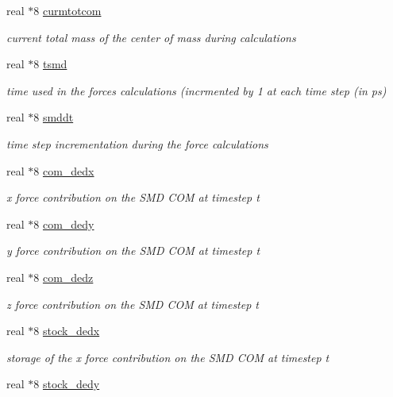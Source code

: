 \begin{DoxyCompactItemize}
real $\ast$8 \hyperlink{classmsmd_a6d28f460b2fadec4e174e9c79639f7cd}{curmtotcom}
\begin{DoxyCompactList}\small\item\em current total mass of the center of mass during calculations \end{DoxyCompactList}\item 
real $\ast$8 \hyperlink{classmsmd_a732bc76cad0c25d269baab2d99fec305}{tsmd}
\begin{DoxyCompactList}\small\item\em time used in the forces calculations (incrmented by 1 at each time step (in ps) \end{DoxyCompactList}\item 
real $\ast$8 \hyperlink{classmsmd_a36703a894904f14db8c7d5c321a5818f}{smddt}
\begin{DoxyCompactList}\small\item\em time step incrementation during the force calculations \end{DoxyCompactList}\item 
real $\ast$8 \hyperlink{classmsmd_a3b682348e3dcf462e291ec488e2462e2}{com\-\_\-dedx}
\begin{DoxyCompactList}\small\item\em x force contribution on the S\-M\-D C\-O\-M at timestep t \end{DoxyCompactList}\item 
real $\ast$8 \hyperlink{classmsmd_acc40a2acdeb9d72fdaa66c077c28e0b3}{com\-\_\-dedy}
\begin{DoxyCompactList}\small\item\em y force contribution on the S\-M\-D C\-O\-M at timestep t \end{DoxyCompactList}\item 
real $\ast$8 \hyperlink{classmsmd_a724443889995ab799ac4d2f5aee9b63e}{com\-\_\-dedz}
\begin{DoxyCompactList}\small\item\em z force contribution on the S\-M\-D C\-O\-M at timestep t \end{DoxyCompactList}\item 
real $\ast$8 \hyperlink{classmsmd_aff62c6bfe1f5b69ec9b8c2c4362c5dfa}{stock\-\_\-dedx}
\begin{DoxyCompactList}\small\item\em storage of the x force contribution on the S\-M\-D C\-O\-M at timestep t \end{DoxyCompactList}\item 
real $\ast$8 \hyperlink{classmsmd_a4b2d1c318a4e2326b9cccdba264cc363}{stock\-\_\-dedy}

\end{DoxyCompactItemize}
